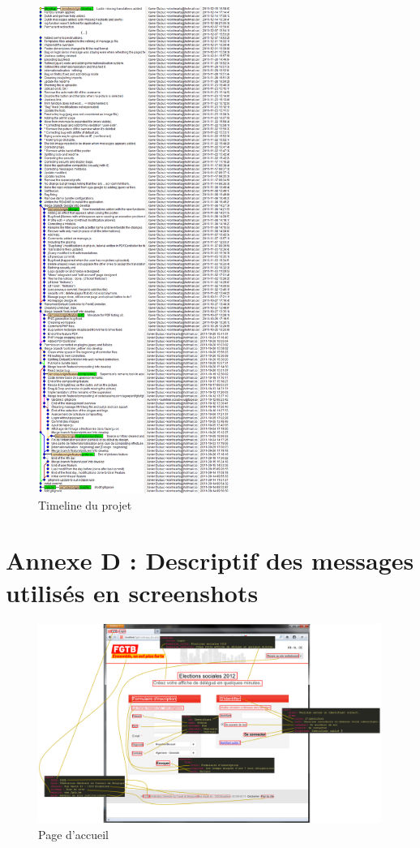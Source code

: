 \documentclass{article}
\begin{document}
\begin{sffamily}
\begin{figure}[!h]
	\begin{center}
		\includegraphics[height=600px]{timeline.png}
	\end{center}
	\caption{Timeline du projet}
\end{figure}

\newpage

\section{Annexe D : Descriptif des messages utilisés en screenshots}\label{messyml}

\begin{figure}[!h]
\includegraphics[width=\textwidth]{messages_homepage.png}
\caption{Page d'accueil}
\end{figure}


\end{sffamily}
\end{document}
